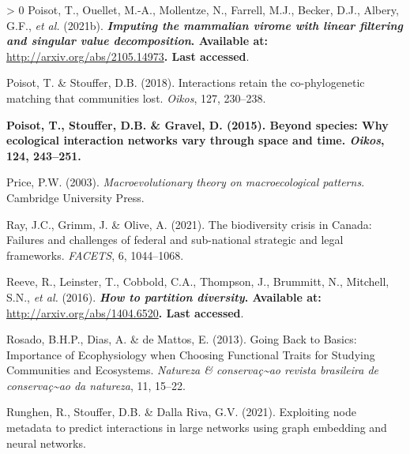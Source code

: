 \documentclass[11pt]{article}
\makeatletter
\def\maxwidth{\ifdim\Gin@nat@width>\linewidth\linewidth
\else\Gin@nat@width\fi}
\let\Oldincludegraphics\includegraphics
\renewcommand{\includegraphics}[1]{\Oldincludegraphics[width=\maxwidth]{#1}}
\newlength{\cslhangindent}
\newenvironment{CSLReferences}[3] %
 {%
  \setlength{\parindent}{0pt}
  \ifodd #1 \everypar{\setlength{\hangindent}{\cslhangindent}}\ignorespaces\fi
  \ifnum #2 > 0
  \setlength{\parskip}{#2\baselineskip}
  \fi
 }%
 {}
\providecommand{\DIFaddtex}[1]{{\bf #1}} %
\providecommand{\DIFdeltex}[1]{} %
\providecommand{\DIFaddbegin}{\protect\color{blue}} %
\providecommand{\DIFaddend}{\protect\color{black}} %
\providecommand{\DIFdelbegin}{\protect\color{red}} %
\providecommand{\DIFdelend}{\protect\color{black}} %
\providecommand{\DIFadd}[1]{\texorpdfstring{\DIFaddtex{#1}}{#1}} %
\providecommand{\DIFdel}[1]{\texorpdfstring{\DIFdeltex{#1}}{}} %
\newcommand{\DIFscaledelfig}{0.5}
\newlength{\DIFdelgraphicswidth} %
\newlength{\DIFdelgraphicsheight} %
\newcommand{\DIFaddincludegraphics}[2][]{{\color{blue}\fbox{\DIFOincludegraphics[#1]{#2}}}} %
\newcommand{\DIFdelincludegraphics}[2][]{%
\sbox{\DIFdelgraphicsbox}{\DIFOincludegraphics[#1]{#2}}%
\settoboxwidth{\DIFdelgraphicswidth}{\DIFdelgraphicsbox} %
\settoboxtotalheight{\DIFdelgraphicsheight}{\DIFdelgraphicsbox} %
\scalebox{\DIFscaledelfig}{%
\parbox[b]{\DIFdelgraphicswidth}{\usebox{\DIFdelgraphicsbox}\\[-\baselineskip] \rule{\DIFdelgraphicswidth}{0em}}\llap{\resizebox{\DIFdelgraphicswidth}{\DIFdelgraphicsheight}{%
\setlength{\unitlength}{\DIFdelgraphicswidth}%
\begin{picture}(1,1)%
\thicklines\linethickness{2pt} %
{\color[rgb]{1,0,0}\put(0,0){\framebox(1,1){}}}%
{\color[rgb]{1,0,0}\put(0,0){\line( 1,1){1}}}%
{\color[rgb]{1,0,0}\put(0,1){\line(1,-1){1}}}%
\end{picture}%
}\hspace*{3pt}}} %
} %
\DeclareRobustCommand{\DIFaddbegin}{\DIFOaddbegin \let\includegraphics\DIFaddincludegraphics} %
\DeclareRobustCommand{\DIFaddend}{\DIFOaddend \let\includegraphics\DIFOincludegraphics} %
\DeclareRobustCommand{\DIFdelbegin}{\DIFOdelbegin \let\includegraphics\DIFdelincludegraphics} %
\DeclareRobustCommand{\DIFdelend}{\DIFOaddend \let\includegraphics\DIFOincludegraphics} %
\makeatother
\begin{document}
\begin{CSLReferences}{1}{0}
\leavevmode\hypertarget{ref-Poisot2021ImpMam}{}%
Poisot, T., Ouellet, M.-A., Mollentze, N., Farrell, M.J., Becker, D.J.,
Albery, G.F., \emph{et al.} (2021b). \DIFdelbegin \DIFdel{Imputing the mammalian virome with
linear filtering and singular value decomposition. \emph{arXiv:2105.14973 {[}q-bio{]}}}\DIFdelend \DIFaddbegin \DIFadd{\emph{Imputing the mammalian virome
with linear filtering and singular value decomposition}. Available at:
}\url{http://arxiv.org/abs/2105.14973}\DIFadd{. Last accessed}\DIFaddend .

\leavevmode\hypertarget{ref-Poisot2018IntRet}{}%
Poisot, T. \& Stouffer, D.B. (2018). Interactions retain the
co-phylogenetic matching that communities lost. \emph{Oikos}, 127,
230--238.

\leavevmode\DIFaddbegin \hypertarget{ref-Poisot2015SpeWhy}{}%
\DIFadd{Poisot, T., Stouffer, D.B. \& Gravel, D. (2015). Beyond species: Why
ecological interaction networks vary through space and time.
\emph{Oikos}, 124, 243--251.
}

\leavevmode\DIFaddend \hypertarget{ref-Price2003MacThe}{}%
Price, P.W. (2003). \emph{Macroevolutionary theory on macroecological
patterns}. Cambridge University Press.

\leavevmode\hypertarget{ref-Ray2021BioCri}{}%
Ray, J.C., Grimm, J. \& Olive, A. (2021). The biodiversity crisis in
Canada: Failures and challenges of federal and sub-national strategic
and legal frameworks. \emph{FACETS}, 6, 1044--1068.

\leavevmode\hypertarget{ref-Reeve2016HowPar}{}%
Reeve, R., Leinster, T., Cobbold, C.A., Thompson, J., Brummitt, N.,
Mitchell, S.N., \emph{et al.} (2016). \DIFdelbegin \DIFdel{How to partition diversity.
\emph{arXiv:1404.6520 {[}q-bio{]}}}\DIFdelend \DIFaddbegin \DIFadd{\emph{How to partition diversity}.
Available at: }\url{http://arxiv.org/abs/1404.6520}\DIFadd{. Last accessed}\DIFaddend .

\leavevmode\hypertarget{ref-Rosado2013GoiBac}{}%
Rosado, B.H.P., Dias, A. \& de Mattos, E. (2013). Going Back to Basics:
Importance of Ecophysiology when Choosing Functional Traits for Studying
Communities and Ecosystems. \emph{Natureza \&
conservaç\textasciitilde ao revista brasileira de
conservaç\textasciitilde ao da natureza}, 11, 15--22.

\leavevmode\hypertarget{ref-Runghen2021ExpNod}{}%
Runghen, R., Stouffer, D.B. \& Dalla Riva, G.V. (2021). Exploiting node
metadata to predict interactions in large networks using graph embedding
and neural networks.


\end{CSLReferences}
\end{document}
